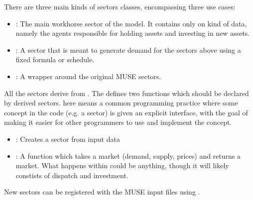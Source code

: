 \documentclass[letterpaper,10pt,english]{sphinxmanual}
\begin{document}
There are three main kinds of sectors classes, encompassing three use cases:
\begin{itemize}
\item {} 
: The main workhorse sector of the model. It
contains only on kind of data, namely the agents responsible for holding assets and
investing in new assets.

\item {} 
: A sector that is meant to generate
demand for the sectors above using a fixed formula or schedule.

\item {} 
: A wrapper around the original MUSE
sectors.

\end{itemize}

All the sectors derive from . The  defines
two  functions which should be declared by derived sectors. 
here means a common programming practice where some concept in the code (e.g. a sector)
is given an explicit interface, with the goal of making it easier for other programmers
to use and implement the concept.
\begin{itemize}
\item {} 
: Creates a sector from input data

\item {} 
: A function which takes a market (demand, supply,
prices) and returns a market.  What happens within could be anything, though it will
likely constists of dispatch and investment.

\end{itemize}

New sectors can be registered with the MUSE input files using
.
\end{document}
